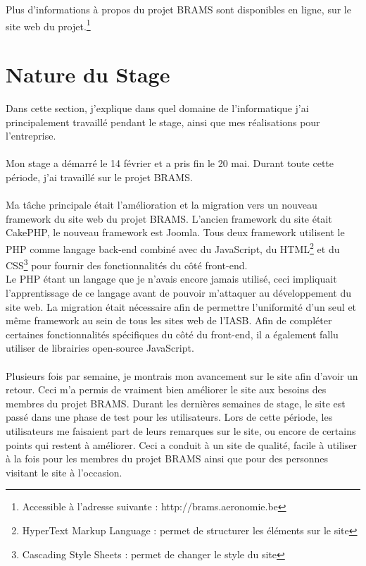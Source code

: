 \documentclass[11pt]{article}
\begin{document}
\vspace{10pt}
Plus d'informations à propos du projet BRAMS sont disponibles en ligne, sur le site web du projet.\footnote{Accessible à l’adresse suivante : http://brams.aeronomie.be}

\newpage

\section{Nature du Stage}

Dans cette section, j'explique dans quel domaine de l'informatique j'ai principalement travaillé pendant le stage, ainsi que mes réalisations pour l'entreprise.\\
\\
Mon stage a démarré le 14 février et a pris fin le 20 mai. Durant toute cette période, j'ai travaillé sur le projet BRAMS.\\
\\
Ma tâche principale était l'amélioration et la migration vers un nouveau framework du site web du projet BRAMS.
L'ancien framework du site était CakePHP, le nouveau framework est Joomla. Tous deux framework utilisent le PHP comme langage back-end combiné avec du JavaScript, du HTML\footnote{HyperText Markup Language : permet de structurer les éléments sur le site} et du CSS\footnote{Cascading Style Sheets : permet de changer le style du site} pour fournir des fonctionnalités du côté front-end.\\
Le PHP étant un langage que je n'avais encore jamais utilisé, ceci impliquait l'apprentissage de ce langage avant de pouvoir m'attaquer au développement du site web.
La migration était nécessaire afin de permettre l'uniformité d'un seul et même framework au sein de tous les sites web de l'IASB.
Afin de compléter certaines fonctionnalités spécifiques du côté du front-end, il a également fallu utiliser de librairies open-source JavaScript.\\
\\
Plusieurs fois par semaine, je montrais mon avancement sur le site afin d'avoir un retour.
Ceci m'a permis de vraiment bien améliorer le site aux besoins des membres du projet BRAMS.
Durant les dernières semaines de stage, le site est passé dans une phase de test pour les utilisateurs.
Lors de cette période, les utilisateurs me faisaient part de leurs remarques sur le site, ou encore de certains points qui restent à améliorer.
Ceci a conduit à un site de qualité, facile à utiliser à la fois pour les membres du projet BRAMS ainsi que pour des personnes visitant le site à l'occasion.
\end{document}
